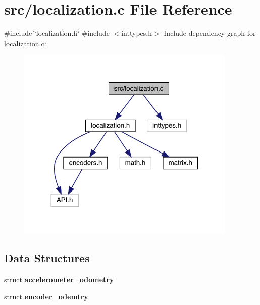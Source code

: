 \section{src/localization.c File Reference}
\label{localization_8c}
{\ttfamily \#include \char`\"{}localization.\+h\char`\"{}}\newline
{\ttfamily \#include $<$inttypes.\+h$>$}\newline
Include dependency graph for localization.\+c\+:
\nopagebreak
\begin{figure}[H]
\begin{center}
\leavevmode
\includegraphics[width=298pt]{localization_8c__incl}
\end{center}
\end{figure}
\subsection*{Data Structures}
\begin{DoxyCompactItemize}
\item 
struct \textbf{ accelerometer\+\_\+odometry}
\item 
struct \textbf{ encoder\+\_\+odemtry}
\end{DoxyCompactItemize}
